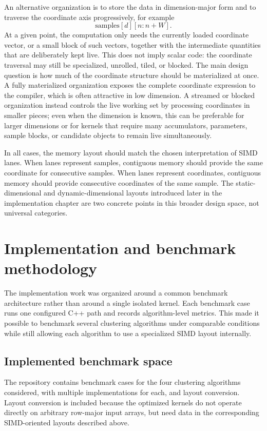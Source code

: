 \documentclass[11pt,a4paper]{article}
\begin{document}
An alternative organization is to store the data in dimension-major form and to traverse the coordinate axis progressively, for example \[ \text{samples}[d][n:n+W]. \] At a given point, the computation only needs the currently loaded coordinate vector, or a small block of such vectors, together with the intermediate quantities that are deliberately kept live. This does not imply scalar code: the coordinate traversal may still be specialized, unrolled, tiled, or blocked. The main design question is how much of the coordinate structure should be materialized at once. A fully materialized organization exposes the complete coordinate expression to the compiler, which is often attractive in low dimension. A streamed or blocked organization instead controls the live working set by processing coordinates in smaller pieces; even when the dimension is known, this can be preferable for larger dimensions or for kernels that require many accumulators, parameters, sample blocks, or candidate objects to remain live simultaneously.

In all cases, the memory layout should match the chosen interpretation of SIMD lanes. When lanes represent samples, contiguous memory should provide the same coordinate for consecutive samples. When lanes represent coordinates, contiguous memory should provide consecutive coordinates of the same sample. The static-dimensional and dynamic-dimensional layouts introduced later in the implementation chapter are two concrete points in this broader design space, not universal categories.

\section{Implementation and benchmark methodology}

The implementation work was organized around a common benchmark architecture rather than around a single isolated kernel. Each benchmark case runs one configured C++ path and records algorithm-level metrics. This made it possible to benchmark several clustering algorithms under comparable conditions while still allowing each algorithm to use a specialized SIMD layout internally.

\subsection{Implemented benchmark space}

The repository contains benchmark cases for the four clustering algorithms considered, with multiple implementations for each, and layout conversion. Layout conversion is included because the optimized kernels do not operate directly on arbitrary row-major input arrays, but need data in the corresponding SIMD-oriented layouts described above.
\end{document}
